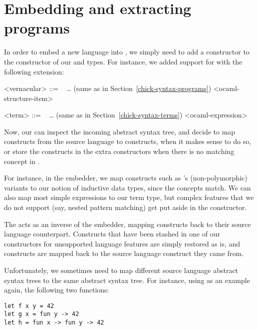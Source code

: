 \section{Embedding and extracting programs}\label{coop-embedding-extracting}

In order to embed a new language into \Chick{}, we simply need to add a
constructor to the constructor of our  and
 types.  For instance, we added support for \OCaml{} with the
following extension:

\begin{grammar}
<vernacular> ::= \ %
\alt … \hfill (same as in Section~\ref{chick-syntax-programs})
\alt {} <ocaml-structure-item>

<term> ::= \ %
\alt … \hfill (same as in Section~\ref{chick-syntax-terms})
\alt {} <ocaml-expression>
\end{grammar}

Now, our  can inspect the incoming abstract syntax tree, and
decide to map constructs from the source language to \Chick{} constructs, when
it makes sense to do so, or store the constructs in the extra constructors when
there is no matching concept in \Chick{}.

For instance, in the \OCaml{} embedder, we map constructs such as \OCaml{}'s
(non-polymorphic) variants to our notion of inductive data types, since the
concepts match.  We can also map most simple expressions to our term type, but
complex features that we do not support (say, nested pattern matching) get put
aside in the  constructor.

The  acts as an inverse of the embedder, mapping \Chick{}
constructs back to their source language counterpart.  Constructs that have
been stashed in one of our constructors for unsupported language features
are simply restored as is, and \Chick{} constructs are mapped back to the
source language construct they came from.

Unfortunately, we sometimes need to map different source language abstract
syntax trees to the same \Chick{} abstract syntax tree.  For instance,
using \OCaml{} as an example again, the following two functions:

\begin{verbatim}
let f x y = 42
let g x = fun y -> 42
let h = fun x -> fun y -> 42
\end{verbatim}

